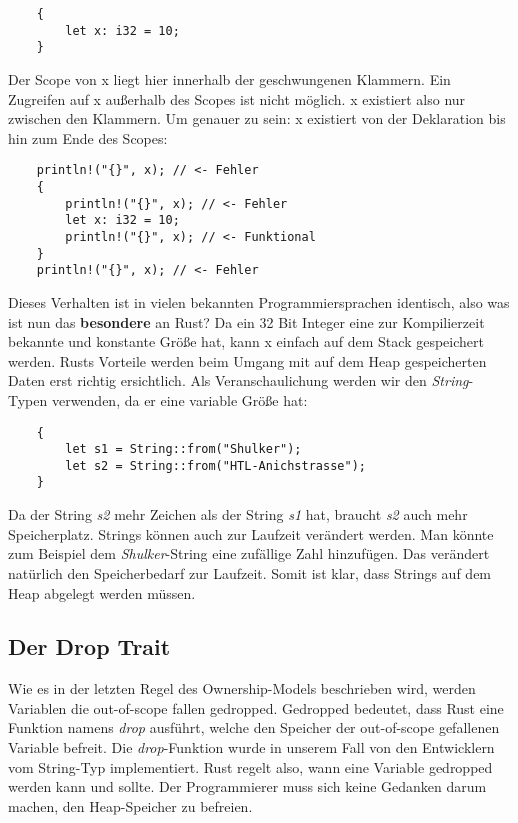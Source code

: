 \begin{lstlisting}
    {
        let x: i32 = 10;
    }
\end{lstlisting}

Der Scope von x liegt hier innerhalb der geschwungenen Klammern. Ein Zugreifen auf x außerhalb des Scopes ist nicht möglich. x existiert also nur
zwischen den Klammern. Um genauer zu sein: x existiert von der Deklaration bis hin zum Ende des Scopes:
\begin{lstlisting}
    println!("{}", x); // <- Fehler
    {
        println!("{}", x); // <- Fehler
        let x: i32 = 10;
        println!("{}", x); // <- Funktional
    }
    println!("{}", x); // <- Fehler
\end{lstlisting}

Dieses Verhalten ist in vielen bekannten Programmiersprachen identisch, also was ist nun das \textbf{besondere} an Rust? Da ein 32 Bit Integer
eine zur Kompilierzeit bekannte und konstante Größe hat, kann x einfach auf dem Stack gespeichert werden. Rusts Vorteile werden beim Umgang mit
auf dem Heap gespeicherten Daten erst richtig ersichtlich. Als Veranschaulichung werden wir den \textit{String}-Typen verwenden, da er eine
variable Größe hat:
\begin{lstlisting}
    {
        let s1 = String::from("Shulker");
        let s2 = String::from("HTL-Anichstrasse");
    }
\end{lstlisting}

Da der String \textit{s2} mehr Zeichen als der String \textit{s1} hat, braucht \textit{s2} auch mehr Speicherplatz. Strings können auch zur Laufzeit
verändert werden. Man könnte zum Beispiel dem \textit{Shulker}-String eine zufällige Zahl hinzufügen. Das verändert natürlich den Speicherbedarf zur
Laufzeit. Somit ist klar, dass Strings auf dem Heap abgelegt werden müssen.

\subsection{Der Drop Trait}
Wie es in der letzten Regel des Ownership-Models beschrieben wird, werden Variablen die out-of-scope fallen gedropped. Gedropped bedeutet, dass Rust
eine Funktion namens \textit{drop} ausführt, welche den Speicher der out-of-scope gefallenen Variable befreit. Die \textit{drop}-Funktion wurde in
unserem Fall von den Entwicklern vom String-Typ implementiert. Rust regelt also, wann eine Variable gedropped werden kann und sollte. Der Programmierer
muss sich keine Gedanken darum machen, den Heap-Speicher zu befreien.

